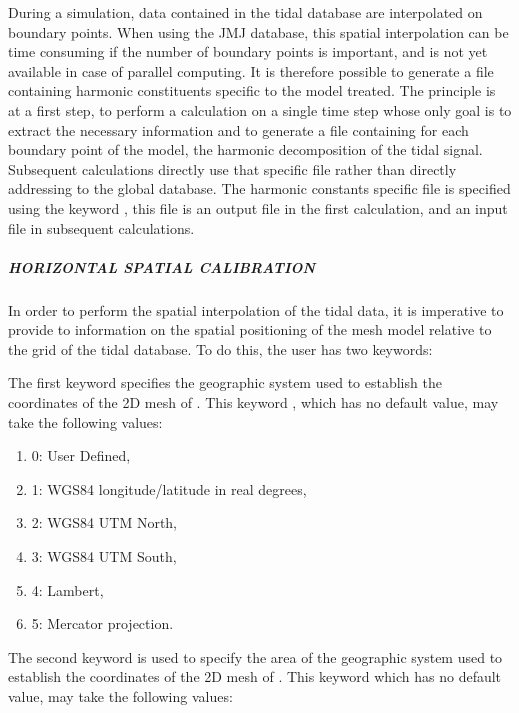  During a simulation, data contained in the tidal database are interpolated on boundary points. When using the JMJ database, this spatial interpolation can be time consuming if the number of boundary points is important, and is not yet available in case of parallel computing. It is therefore possible to generate a file containing harmonic constituents specific to the model treated. The principle is at a first step, to perform a calculation on a single time step whose only goal is to extract the necessary information and to generate a file containing for each boundary point of the model, the harmonic decomposition of the tidal signal. Subsequent calculations directly use that specific file rather than directly addressing to the global database. The harmonic constants specific file is specified using the keyword , this file is an output file in the first calculation, and an input file in subsequent calculations.


\subparagraph{ HORIZONTAL SPATIAL CALIBRATION}

 In order to perform the spatial interpolation of the tidal data, it is imperative to provide to  information on the spatial positioning of the mesh model relative to the grid of the tidal database. To do this, the user has two keywords:

 The first keyword specifies the geographic system used to establish the coordinates of the 2D mesh of . This keyword , which has no default value, may take the following values:

\begin{enumerate}
\item [\nonumber] 0: User Defined,

\item [\nonumber] 1: WGS84 longitude/latitude in real degrees,

\item [\nonumber] 2: WGS84 UTM North,

\item [\nonumber] 3: WGS84 UTM South,

\item [\nonumber] 4: Lambert,

\item [\nonumber] 5: Mercator projection.
\end{enumerate}

 The second keyword is used to specify the area of the geographic system used to establish the coordinates of the 2D mesh of . This keyword  which has no default value, may take the following values:

